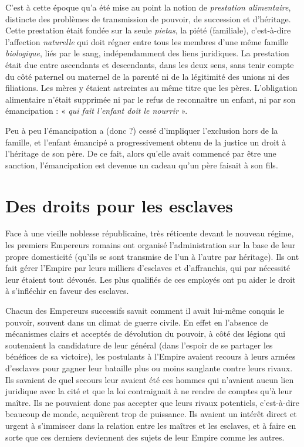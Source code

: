  C'est à cette époque qu'a été mise au point la notion de \emph{prestation alimentaire}, distincte des problèmes de transmission de pouvoir, de succession et d'héritage. Cette prestation était fondée sur la seule \emph{pietas}, la piété (familiale), c'est-à-dire l'affection \emph{naturelle} qui doit régner entre tous les membres d'une même famille \emph{biologique}, liés par le sang, indépendamment des liens juridiques. La prestation était due entre ascendants et descendants, dans les deux sens, sans tenir compte du côté paternel ou maternel de la parenté ni de la légitimité des unions ni des filiations. Les mères y étaient astreintes au même titre que les pères. L'obligation alimentaire n'était supprimée ni par le refus de reconnaître un enfant, ni par son émancipation : « \emph{qui fait l'enfant doit le nourrir} ». 

 Peu à peu l'émancipation a (donc ?) cessé d'impliquer l'exclusion hors de la famille, et l'enfant émancipé a progressivement obtenu de la justice un droit à l'héritage de son père. De ce fait, alors qu'elle avait commencé par être une sanction, l'émancipation est devenue un cadeau qu'un père faisait à son fils.


\section{Des droits pour les esclaves}

 Face à une vieille noblesse républicaine, très réticente devant le nouveau régime, les premiers Empereurs romains ont organisé l'administration sur la base de leur propre domesticité (qu'ils se sont transmise de l'un à l'autre par héritage). Ils ont fait gérer l'Empire par leurs milliers d'esclaves et d'affranchis, qui par nécessité leur étaient tout dévoués. Les plus qualifiés de ces employés ont pu aider le droit à s'infléchir en faveur des esclaves. 

 Chacun des Empereurs successifs savait comment il avait lui-même conquis le pouvoir, souvent dans un climat de guerre civile. En effet en l'absence de mécanismes clairs et acceptés de dévolution du pouvoir, à côté des légions qui soutenaient la candidature de leur général (dans l'espoir de se partager les bénéfices de sa victoire), les postulants à l'Empire avaient recours à leurs armées d'esclaves pour gagner leur bataille plus ou moins sanglante contre leurs rivaux. Ils savaient de quel secours leur avaient été ces hommes qui n'avaient aucun lien juridique avec la cité et que la loi contraignait à ne rendre de comptes qu'à leur maître. Ils ne pouvaient donc pas accepter que leurs rivaux potentiels, c'est-à-dire beaucoup de monde, acquièrent trop de puissance. Ils avaient un intérêt direct et urgent à s'immiscer dans la relation entre les maîtres et les esclaves, et à faire en sorte que ces derniers deviennent des sujets de leur Empire comme les autres. 


